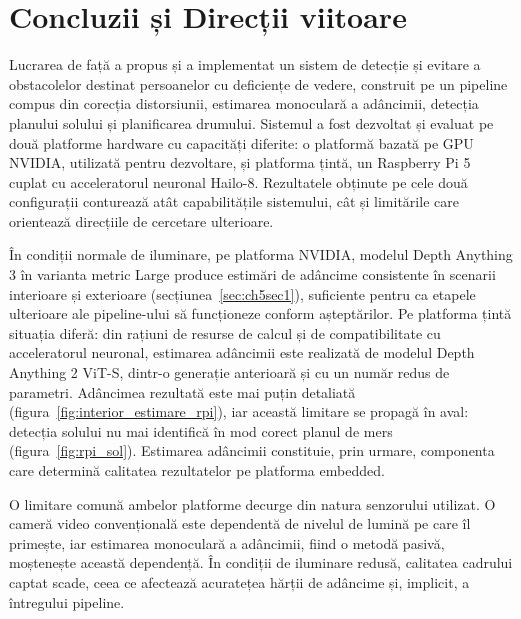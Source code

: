 \chapter{Concluzii și Direcții viitoare}
\label{conclusions}

Lucrarea de față a propus și a implementat un sistem de detecție și evitare a obstacolelor destinat persoanelor cu deficiențe de vedere, construit pe un pipeline compus din corecția distorsiunii, estimarea monoculară a adâncimii, detecția planului solului și planificarea drumului. Sistemul a fost dezvoltat și evaluat pe două platforme hardware cu capacități diferite: o platformă bazată pe GPU NVIDIA, utilizată pentru dezvoltare, și platforma țintă, un Raspberry Pi 5 cuplat cu acceleratorul neuronal Hailo-8. Rezultatele obținute pe cele două configurații conturează atât capabilitățile sistemului, cât și limitările care orientează direcțiile de cercetare ulterioare.

În condiții normale de iluminare, pe platforma NVIDIA, modelul Depth Anything 3 în varianta metric Large produce estimări de adâncime consistente în scenarii interioare și exterioare (secțiunea~\ref{sec:ch5sec1}), suficiente pentru ca etapele ulterioare ale pipeline-ului să funcționeze conform așteptărilor. Pe platforma țintă situația diferă: din rațiuni de resurse de calcul și de compatibilitate cu acceleratorul neuronal, estimarea adâncimii este realizată de modelul Depth Anything 2 ViT-S, dintr-o generație anterioară și cu un număr redus de parametri. Adâncimea rezultată este mai puțin detaliată (figura~\ref{fig:interior_estimare_rpi}), iar această limitare se propagă în aval: detecția solului nu mai identifică în mod corect planul de mers (figura~\ref{fig:rpi_sol}). Estimarea adâncimii constituie, prin urmare, componenta care determină calitatea rezultatelor pe platforma embedded.

O limitare comună ambelor platforme decurge din natura senzorului utilizat. O cameră video convențională este dependentă de nivelul de lumină pe care îl primește, iar estimarea monoculară a adâncimii, fiind o metodă pasivă, moștenește această dependență. În condiții de iluminare redusă, calitatea cadrului captat scade, ceea ce afectează acuratețea hărții de adâncime și, implicit, a întregului pipeline.

